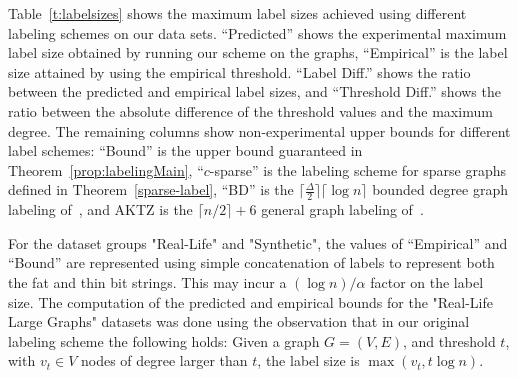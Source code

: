Table~\ref{t:labelsizes}  shows  the maximum label sizes achieved using different labeling schemes on our data sets. ``Predicted'' shows the experimental maximum label size obtained by running our scheme on the graphs, ``Empirical'' is the label size attained by using the empirical threshold.
``Label Diff.'' shows the ratio between the predicted and empirical label sizes, and  ``Threshold Diff.'' shows the ratio between the absolute difference of the threshold values and the maximum degree.
 The remaining columns show non-experimental upper bounds for different label schemes: ``Bound'' is the upper bound guaranteed in Theorem~\ref{prop:labelingMain}, ``$c$-sparse'' is  the labeling scheme for sparse graphs defined in Theorem~\ref{sparse-label}, ``BD'' is the $\lceil \frac{\Delta}{2} \rceil \lceil \log n\rceil$ bounded degree graph  labeling of~\cite{adjiashvili2014labeling}, and AKTZ is the $\lceil n/2\rceil+6$ general graph  labeling of~\cite{alstrup2014adjacency}.
 
For the dataset groups "Real-Life" and "Synthetic", the values of  ``Empirical'' and  ``Bound'' are represented using simple concatenation of labels to represent both the fat and thin bit strings. This may incur a $(\log n)/\alpha$ factor on the label size.
The computation of the predicted and empirical bounds for the "Real-Life Large Graphs" datasets was done using the observation that in our original labeling scheme the following holds: Given a  graph $G=(V,E)$, and threshold $t$, with $v_t \in V$ nodes of degree larger than $t$, the label size is $\max{(v_t,t \log n)}$.

